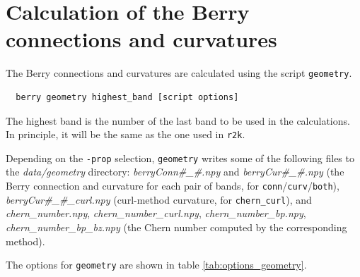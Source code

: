 \documentclass[a4paper,12pt]{report}
\begin{document}
\section{Calculation of the Berry connections and curvatures}

The Berry connections and curvatures are calculated using the script \texttt{geometry}.
\begin{verbatim}
  berry geometry highest_band [script options]
 \end{verbatim}


The highest band is the number of the last band to be used in the calculations.
In principle, it will be the same as the one used in \texttt{r2k}.

Depending on the \texttt{-prop} selection, \texttt{geometry} writes some of the following files
to the \emph{data/geometry} directory: \emph{berryConn\#\_\#.npy} and \emph{berryCur\#\_\#.npy}
(the Berry connection and curvature for each pair of bands, for \texttt{conn}/\texttt{curv}/\texttt{both}),
\emph{berryCur\#\_\#\_curl.npy} (curl-method curvature, for \texttt{chern\_curl}), and
\emph{chern\_number.npy}, \emph{chern\_number\_curl.npy}, \emph{chern\_number\_bp.npy},
\emph{chern\_number\_bp\_bz.npy} (the Chern number computed by the corresponding method).

The options for \texttt{geometry} are shown in table \ref{tab:options_geometry}.
\end{document}
